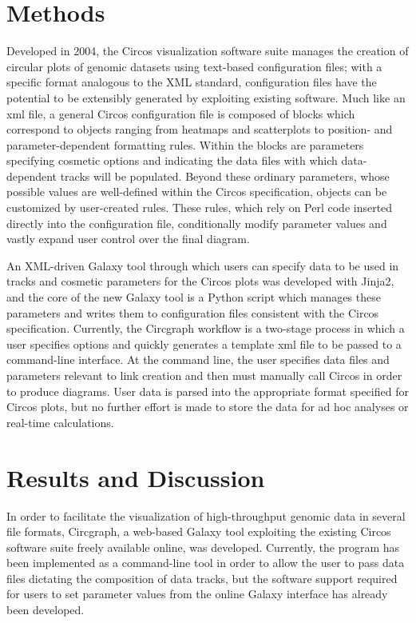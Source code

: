 \documentclass[twocolumn]{article}
\begin{document}
\section*{Methods}
Developed in 2004, the Circos visualization software suite manages the creation of circular plots of genomic datasets using text-based configuration files; with a specific format analogous to the XML standard, configuration files have the potential to be extensibly generated by exploiting existing software.\cite{circospaper} Much like an xml file, a general Circos configuration file is composed of blocks which correspond to objects ranging from heatmaps and scatterplots to position- and parameter-dependent formatting rules.\cite{circospaper} Within the blocks are parameters specifying cosmetic options and indicating the data files with which data-dependent tracks will be populated.\cite{circospaper} Beyond these ordinary parameters, whose possible values are well-defined within the Circos specification, objects can be customized by user-created rules.\cite{circospaper} These rules, which rely on Perl code inserted directly into the configuration file, conditionally modify parameter values and vastly expand user control over the final diagram. \cite{circospaper}

An XML-driven Galaxy tool through which users can specify data to be used in tracks and cosmetic parameters for the Circos plots was developed with Jinja2, and the core of the new Galaxy tool is a Python script which manages these parameters and writes them to configuration files consistent with the Circos specification. Currently, the Circgraph workflow is a two-stage process in which a user specifies options and quickly generates a template xml file to be passed to a command-line interface. At the command line, the user specifies data files and parameters relevant to link creation and then must manually call Circos in order to produce diagrams. User data is parsed into the appropriate format specified for Circos plots, but no further effort is made to store the data for ad hoc analyses or real-time calculations.

\section*{Results and Discussion}

In order to facilitate the visualization of high-throughput genomic data in several file formats, Circgraph, a web-based Galaxy tool exploiting the existing Circos software suite freely available online, was developed. Currently, the program has been implemented as a command-line tool in order to allow the user to pass data files dictating the composition of data tracks, but the software support required for users to set parameter values from the online Galaxy interface has already been developed.
\end{document}

